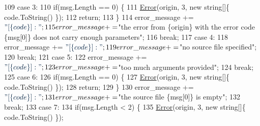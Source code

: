 \begin{DoxyCode}
109                                 \textcolor{keywordflow}{case} 3:
110                                     \textcolor{keywordflow}{if}(msg.Length == 0) \{
111                                         \mbox{\hyperlink{class_compiler_1_1_compiler_af3467c4a37bb5379d3da14188042193c}{Error}}(origin, 3, \textcolor{keyword}{new} \textcolor{keywordtype}{string}[]\{ code.ToString() \});
112                                         \textcolor{keywordflow}{return};
113                                     \}
114                                     error\_message += $\textcolor{stringliteral}{"[\{code\}] : "};
115                                     error\_message += $\textcolor{stringliteral}{"the error from \{origin\} with the error code \{msg[0]\}
       does not carry enough parameters"};
116                                     \textcolor{keywordflow}{break};
117                                 \textcolor{keywordflow}{case} 4:
118                                     error\_message += $\textcolor{stringliteral}{"[\{code\}] : "};
119                                     error\_message += $\textcolor{stringliteral}{"no source file specified"};
120                                     \textcolor{keywordflow}{break};
121                                 \textcolor{keywordflow}{case} 5:
122                                     error\_message += $\textcolor{stringliteral}{"[\{code\}] : "};
123                                     error\_message += $\textcolor{stringliteral}{"too much arguments provided"};
124                                     \textcolor{keywordflow}{break};
125                                 \textcolor{keywordflow}{case} 6:
126                                     \textcolor{keywordflow}{if}(msg.Length == 0) \{
127                                         \mbox{\hyperlink{class_compiler_1_1_compiler_af3467c4a37bb5379d3da14188042193c}{Error}}(origin, 3, \textcolor{keyword}{new} \textcolor{keywordtype}{string}[]\{ code.ToString() \});
128                                         \textcolor{keywordflow}{return};
129                                     \}
130                                     error\_message += $\textcolor{stringliteral}{"[\{code\}] : "};
131                                     error\_message += $\textcolor{stringliteral}{"the source file \{msg[0]\} is empty"};
132                                     \textcolor{keywordflow}{break};
133                                 \textcolor{keywordflow}{case} 7:
134                                     \textcolor{keywordflow}{if}(msg.Length < 2) \{
135                                         \mbox{\hyperlink{class_compiler_1_1_compiler_af3467c4a37bb5379d3da14188042193c}{Error}}(origin, 3, \textcolor{keyword}{new} \textcolor{keywordtype}{string}[]\{ code.ToString() \});

\end{DoxyCode}
